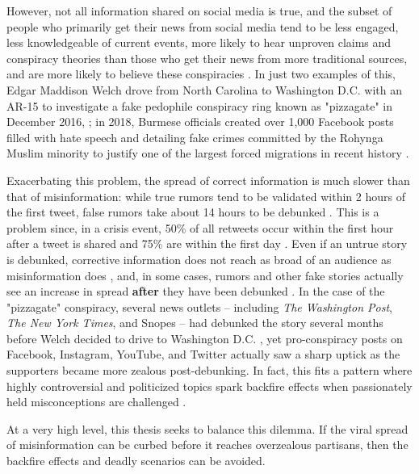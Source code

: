\documentclass[preprint,review,12pt]{elsarticle}
\begin{document}
However, not all information shared on social media is true, and the subset of people who primarily get their news from social media tend to be less engaged, less knowledgeable of current events, more likely to hear unproven claims and conspiracy theories than those who get their news from more traditional sources, and are more likely to believe these conspiracies \cite{mitchell2020americans}. In just two examples of this, Edgar Maddison Welch drove from North Carolina to Washington D.C. with an AR-15 to investigate a fake pedophile conspiracy ring known as "pizzagate" in December 2016, \cite{goldman2016comet}; in 2018, Burmese officials created over 1,000 Facebook posts filled with hate speech and detailing fake crimes committed by the Rohynga Muslim minority to justify one of the largest forced migrations in recent history \cite{subedar2018country}.

Exacerbating this problem, the spread of correct information is much slower than that of misinformation: while true rumors tend to be validated within 2 hours of the first tweet, false rumors take about 14 hours to be debunked \cite{zubiaga2016analysing,shao2016hoaxy}. This is a problem since, in a crisis event, 50\% of all retweets occur within the first hour after a tweet is shared and 75\% are within the first day \cite{kwak2010twitter}. Even if an untrue story is debunked, corrective information does not reach as broad of an audience as misinformation does \cite{maddock2015characterizing, vosoughi2018spread}, and, in some cases, rumors and other fake stories actually see an increase in spread \textbf{after} they have been debunked \cite{starbird2014rumors}. In the case of the "pizzagate" conspiracy, several news outlets -- including \textit{The Washington Post}, \textit{The New York Times}, and Snopes -- had debunked the story several months before Welch decided to drive to Washington D.C. \cite{kang2016fake,lacapria2016fact,board_2016}, yet pro-conspiracy posts on Facebook, Instagram, YouTube, and Twitter actually saw a sharp uptick as the supporters became more zealous post-debunking\cite{kang2016washington}. In fact, this fits a pattern where highly controversial and politicized topics spark backfire effects when passionately held misconceptions are challenged \cite{gollust2009polarizing,nyhan2010corrections,nyhan2013hazards,redlawsk2010affective,schaffner2016misinformation,hart2012boomerang}.

At a very high level, this thesis seeks to balance this dilemma. If the viral spread of misinformation can be curbed before it reaches overzealous partisans, then the backfire effects and deadly scenarios can be avoided. 
\end{document}
